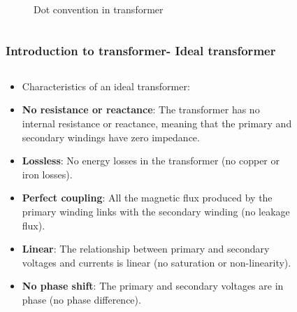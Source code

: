 \begin{frame}
\begin{columns}
\begin{column}{0.25\textwidth}
\begin{figure}
                \caption{Dot convention in transformer}
			\end{figure}
      \end{column}
    \end{columns}  
\end{frame}

\begin{frame}
	\frametitle{Introduction to transformer- Ideal transformer}
    \begin{columns}
     \begin{column}{0.6\textwidth}
      \begin{itemize}
        \item Characteristics of an ideal transformer:
        \item \textbf{No resistance or reactance}: The transformer has no internal resistance or reactance, meaning that the primary and secondary windings have zero impedance.
		\item \textbf{Lossless}: No energy losses in the transformer (no copper or iron losses).
        \item \textbf{Perfect coupling}: All the magnetic flux produced by the primary winding links with the secondary winding (no leakage flux).
        \item \textbf{Linear}: The relationship between primary and secondary voltages and currents is linear (no saturation or non-linearity).
        \item \textbf{No phase shift}: The primary and secondary voltages are in phase (no phase difference).
      \end{itemize}
      \end{column}
      \begin{column}{0.4\textwidth}
			\begin{figure}
				\centering
				\includegraphics[width=0.8\textwidth]{fig/lec03/Trans_current.pdf}

\end{figure}
\end{column}
\end{columns}
\end{frame}
